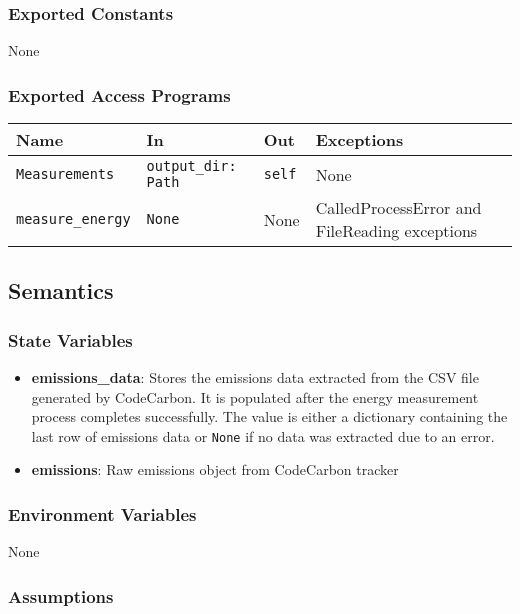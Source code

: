 \documentclass[12pt, titlepage]{article}
\begin{document}
\subsubsection{Exported Constants}
None

\subsubsection{Exported Access Programs}

\begin{center}
\begin{tabularx}{\linewidth}{|l|>{\raggedright\arraybackslash}X|l|l|}
\hline
\textbf{Name} & \textbf{In} & \textbf{Out} & \textbf{Exceptions} \\
\hline
\texttt{Measurements} & \texttt{output\_dir: Path} & \texttt{self} & None \\
\hline
\texttt{measure\_energy} & \texttt{None} & None & CalledProcessError and FileReading exceptions \\
\hline
\end{tabularx}
\end{center}

\subsection{Semantics}

\subsubsection{State Variables}

\begin{itemize}
\item \textbf{emissions\_data}: Stores the emissions data extracted from the CSV file generated by CodeCarbon. It is populated after the energy measurement process completes successfully. The value is either a dictionary containing the last row of emissions data or \texttt{None} if no data was extracted due to an error.
\item \textbf{emissions}: Raw emissions object from CodeCarbon tracker
\end{itemize}

\subsubsection{Environment Variables}
None

\subsubsection{Assumptions}
\end{document}
